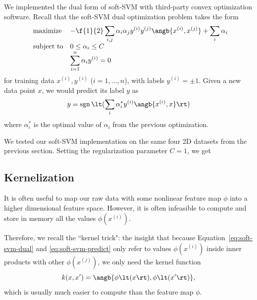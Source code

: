 \documentclass{article}
\DeclareMathOperator{\sgn}{sgn}
\newcommand{\sind}[1]{^{(#1)}}
\begin{document}
\begin{multicols}{2}
We implemented the dual form of soft-SVM
with third-party convex optimization software.
Recall that the soft-SVM dual optimization problem takes the form
\begin{equation}
    \label{eq:soft-svm-dual}
    \begin{array}{ll@{}ll}
        \text{maximize}  &\displaystyle -\f{1}{2}\sum_{i,j} \alpha_i \alpha_j y\sind{i} y\sind{j} \angb{x\sind{i}, x\sind{j}}
        +
        \sum_i \alpha_i \\
        \text{subject to}& 0 \le \alpha_i \le C\\
        & \displaystyle\sum_{i=1}^n \alpha_i y\sind{i} = 0
    \end{array}
\end{equation}
for training data $x\sind{i}, y\sind{i}$ ($i=1, \dots, n$),
with labels $y\sind i = \pm 1$.
Given a new data point $x$,
we would predict its label $y$ as
\begin{equation}
    \label{eq:soft-svm-predict}
    y = \sgn\lt(\sum_i \alpha^*_i y\sind{i} \angb{x\sind{i}, x}\rt)
\end{equation}
where $\alpha^*_i$ is the optimal value of $\alpha_i$
from the previous optimization.


We tested our soft-SVM implementation
on the same four 2D datasets from the previous section.
Setting the regularization parameter $C=1$,
we get %


\subsection{Kernelization}

It is often useful to map our raw data
with some nonlinear feature map $\phi$
into a higher dimensional feature space.
However, it is often infeasible to compute and store in memory
all the values $\phi(x\sind{i})$.

Therefore, we recall the ``kernel trick": the insight that
because Equation~\ref{eq:soft-svm-dual} and \ref{eq:soft-svm-predict}
only refer to values $\phi(x\sind{i})$ inside inner products
with other $\phi(x\sind{j})$,
we only need the kernel function
\begin{equation}
    k(x, x') = \angb{\phi\lt(x\rt), \phi\lt(x'\rt)},
\end{equation}
which is usually much easier to compute than the feature map $\phi$.


\end{multicols}
\end{document}
